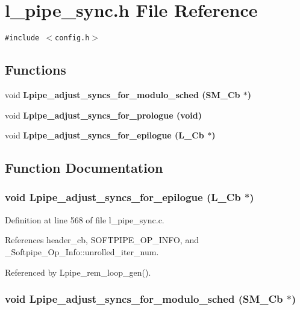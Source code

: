 \section{l\_\-pipe\_\-sync.h File Reference}
\label{l__pipe__sync_8h}
{\tt \#include $<$config.h$>$}\par
\subsection*{Functions}
\begin{CompactItemize}
\item 
void \bf{Lpipe\_\-adjust\_\-syncs\_\-for\_\-modulo\_\-sched} (\bf{SM\_\-Cb} $\ast$)
\item 
void \bf{Lpipe\_\-adjust\_\-syncs\_\-for\_\-prologue} (void)
\item 
void \bf{Lpipe\_\-adjust\_\-syncs\_\-for\_\-epilogue} (L\_\-Cb $\ast$)
\end{CompactItemize}


\subsection{Function Documentation}
\subsubsection{\setlength{\rightskip}{0pt plus 5cm}void Lpipe\_\-adjust\_\-syncs\_\-for\_\-epilogue (L\_\-Cb $\ast$)}\label{l__pipe__sync_8h_2e04b79e2a0ce467271ebbfee10b7a9b}




Definition at line 568 of file l\_\-pipe\_\-sync.c.

References header\_\-cb, SOFTPIPE\_\-OP\_\-INFO, and \_\-Softpipe\_\-Op\_\-Info::unrolled\_\-iter\_\-num.

Referenced by Lpipe\_\-rem\_\-loop\_\-gen().
\subsubsection{\setlength{\rightskip}{0pt plus 5cm}void Lpipe\_\-adjust\_\-syncs\_\-for\_\-modulo\_\-sched (\bf{SM\_\-Cb} $\ast$)}\label{l__pipe__sync_8h_b564d1a85ea22d364eabbe11970d3f24}





